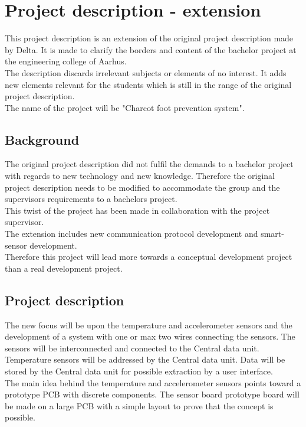 \chapter{Project description - extension}
This project description is an extension of the original project description made by Delta. It is made to clarify the borders and content of the bachelor project at the engineering college of Aarhus.\\
The description discards irrelevant subjects or elements of no interest. It adds new elements relevant for the students which is still in the range of the original project description.\\
The name of the project will be "Charcot foot prevention system".


\section{Background}
The original project description did not fulfil the demands to a bachelor project with regards to new technology and new knowledge. Therefore the original project description needs to be modified to accommodate the group and the supervisors requirements to a bachelors project. \\
This twist of the project has been made in collaboration with the project supervisor.\\
The extension includes new communication protocol development and smart-sensor development.\\
Therefore this project will lead more towards a conceptual development project than a real development project.\\


\section{Project description}
The new focus will be upon the temperature and accelerometer sensors and the development of a system with one or max two wires connecting the sensors. The sensors will be interconnected and connected to the Central data unit. Temperature sensors will be addressed by the Central data  unit. Data will be stored by the Central data unit for possible extraction by a user interface. \\

The main idea behind the temperature and accelerometer sensors points toward a prototype PCB with discrete components. The sensor board prototype board will be made on a large PCB with a simple layout to prove that the concept is possible. \\

